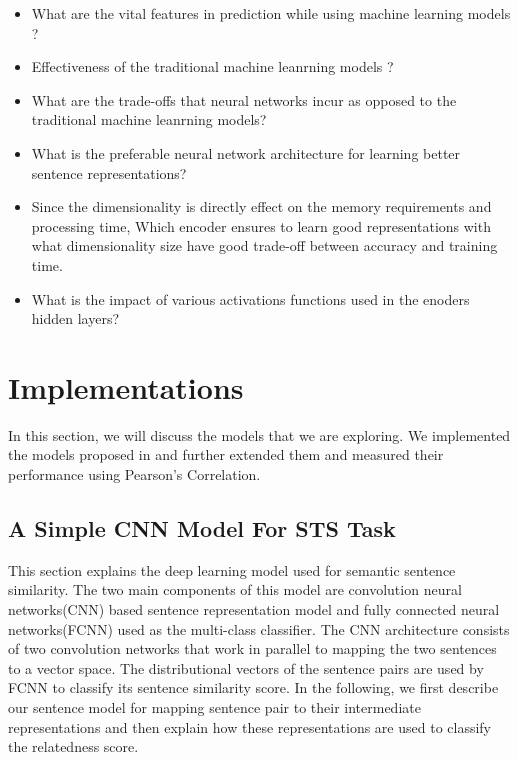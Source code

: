 \documentclass[12pt]{article} %
\begin{document}
\begin{itemize}
	\item What are the vital features in prediction while using machine learning models ?
	\item Effectiveness of the traditional machine leanrning models ?
	\item What are the trade-offs that neural networks
	incur as opposed to the traditional machine leanrning models?
	\item What is the preferable neural network architecture for learning better sentence representations? 
	\item Since the dimensionality is directly effect on the memory requirements and processing time, Which encoder ensures to learn good representations with what dimensionality size have good trade-off between accuracy and training time. 
	\item What is the impact of various activations functions used in the enoders hidden layers?
\end{itemize} 




 
	 
	 
	 
	 

\section{Implementations}
	In this section, we will discuss the models that we are exploring. We implemented the models proposed in \cite{shao2017hcti} and further extended them and measured their performance using Pearson's Correlation.
	
	\subsection{A Simple CNN Model For STS Task}
		This section explains the deep learning model used for semantic sentence similarity. The two main components of this model are convolution neural networks(CNN) based sentence representation model and fully connected neural networks(FCNN) used as the multi-class classifier. The CNN architecture consists of two convolution networks that work in parallel to mapping the two sentences to a vector space. The distributional vectors of the sentence pairs are used by FCNN to classify its sentence similarity score. In the following, we first describe our sentence model for mapping sentence pair to their intermediate representations and then explain how these representations are used to classify the relatedness score.
	
\end{document}

